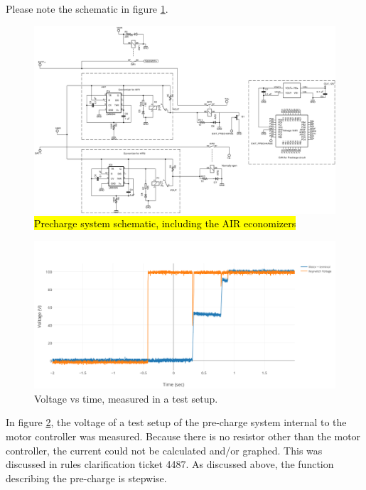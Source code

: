 \documentclass{article}
\DeclareRobustCommand{\hlr}[1]{{\sethlcolor{red}\hl{#1}}}
\begin{document}
        Please note the schematic in figure \ref{prechargeschem}.

        \begin{figure}
            \includegraphics[width=\textheight]{precharge}
            \caption{\hlr{Precharge system schematic, including the AIR economizers}}
            \label{prechargeschem}
        \end{figure}

            \begin{figure}[H]
                \centering
                \includegraphics[width = 0.8 \textwidth]{PrechargeVoltage}
                \caption{Voltage vs time, measured in a test setup. }
                \label{PCvoltage}
            \end{figure}

            In figure \ref{PCvoltage}, the voltage of a test setup of the pre-charge system internal to the motor controller was measured. Because there is no resistor other than the motor controller, the current could not be calculated and/or graphed. This was discussed in rules clarification ticket 4487. As discussed above, the function describing the pre-charge is stepwise.
\end{document}
